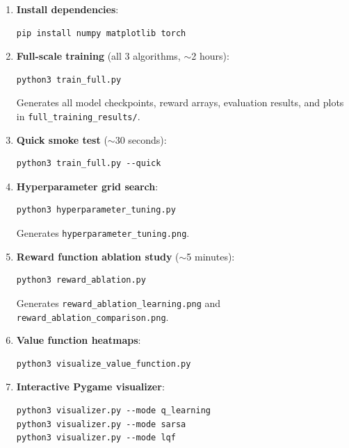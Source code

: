 \documentclass[12pt]{article}
\begin{document}
\begin{enumerate}
    \item \textbf{Install dependencies}:
\begin{verbatim}
pip install numpy matplotlib torch
\end{verbatim}

    \item \textbf{Full-scale training} (all 3 algorithms, $\sim$2 hours):
\begin{verbatim}
python3 train_full.py
\end{verbatim}
    Generates all model checkpoints, reward arrays, evaluation results, and plots
    in \texttt{full\_training\_results/}.

    \item \textbf{Quick smoke test} ($\sim$30 seconds):
\begin{verbatim}
python3 train_full.py --quick
\end{verbatim}

    \item \textbf{Hyperparameter grid search}:
\begin{verbatim}
python3 hyperparameter_tuning.py
\end{verbatim}
    Generates \texttt{hyperparameter\_tuning.png}.

    \item \textbf{Reward function ablation study} ($\sim$5 minutes):
\begin{verbatim}
python3 reward_ablation.py
\end{verbatim}
    Generates \texttt{reward\_ablation\_learning.png} and
    \texttt{reward\_ablation\_comparison.png}.

    \item \textbf{Value function heatmaps}:
\begin{verbatim}
python3 visualize_value_function.py
\end{verbatim}

    \item \textbf{Interactive Pygame visualizer}:
\begin{verbatim}
python3 visualizer.py --mode q_learning
python3 visualizer.py --mode sarsa
python3 visualizer.py --mode lqf
\end{verbatim}
\end{enumerate}
\end{document}
